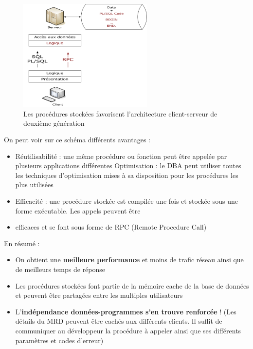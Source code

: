 \documentclass[10pt]{beamer}
\begin{document}
\begin{frame}[allowframebreaks]{\secname}
    \begin{figure}
        \begin{center}
            \includegraphics[width=0.6\textwidth]{../assets/img/client_serveur2.png}
            \caption{Les procédures stockées favorisent l'architecture client-serveur de deuxième génération}
        \end{center}
    \end{figure}
    On peut voir sur ce schéma différents avantages :
    \begin{itemize}
        \item  Réutilisabilité : une même procédure ou fonction peut être appelée par plusieurs applications différentes
              Optimisation : le DBA peut utiliser toutes les techniques d'optimisation mises à sa disposition pour les procédures les plus utilisées
        \item Efficacité : une procédure stockée est compilée une fois et stockée sous une forme exécutable.  Les appels peuvent être
        \item efficaces et se font sous forme de RPC (Remote Procedure Call)
    \end{itemize}
\end{frame}

\begin{frame}[allowframebreaks]{\secname}
    En résumé :
    \begin{itemize}
        \item On obtient une \textbf{meilleure performance} et moins de trafic réseau ainsi que de meilleurs temps de réponse
        \item Les procédures stockées font partie de la mémoire cache de la base de données et peuvent être partagées entre les multiples utilisateurs
        \item L'\textbf{indépendance données-programmes s'en trouve renforcée} ! (Les détails du MRD peuvent être cachés aux différents clients.  Il suffit de communiquer au développeur la procédure à appeler ainsi que ses différents paramètres et codes d'erreur)
    \end{itemize}
\end{frame}
\end{document}
